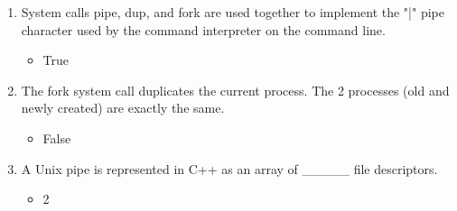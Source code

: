 \documentclass{report}
\begin{document}
\begin{enumerate}
    \item System calls pipe, dup, and fork are used together to implement the "|" pipe character used by the command interpreter on the command line.
    \begin{itemize}
        \item True
    \end{itemize}
    
    \item The fork system call duplicates the current process. The 2 processes (old and newly created) are exactly the same.
    \begin{itemize}
        \item False
    \end{itemize}
    
    \item A Unix pipe is represented in C++ as an array of \_\_\_\_\_ file descriptors.
    \begin{itemize}
        \item 2
    \end{itemize}
\end{enumerate}
\end{document}
